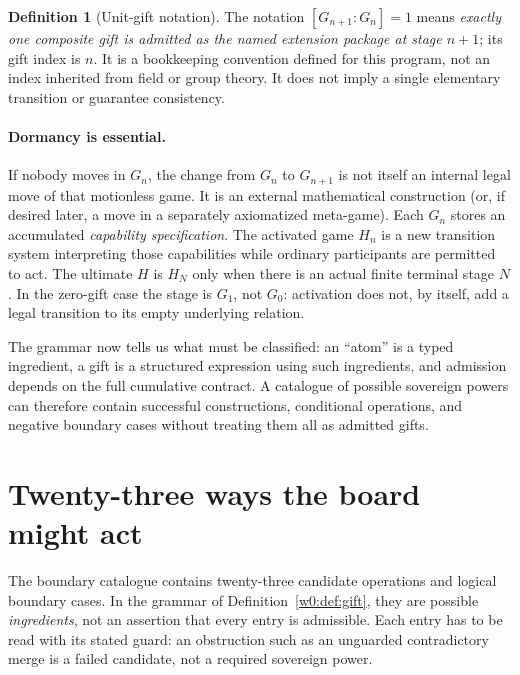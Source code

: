 \documentclass[11pt,letterpaper]{article}
\theoremstyle{definition}\newtheorem{definition}[theorem]{Definition}\newtheorem{example}[theorem]{Example}
\theoremstyle{remark}\newtheorem{remark}[theorem]{Remark}
\begin{document}
\begin{definition}[Unit-gift notation]\label{w0:def:unit}
The notation $[G_{n+1}:G_n]=1$ means \emph{exactly one composite gift is admitted as the named extension package at stage $n+1$}; its gift index is $n$. It is a bookkeeping convention defined for this program, not an index inherited from field or group theory. It does not imply a single elementary transition or guarantee consistency.
\end{definition}

\paragraph{Dormancy is essential.} If nobody moves in $G_n$, the change from $G_n$ to $G_{n+1}$ is not itself an internal legal move of that motionless game. It is an external mathematical construction (or, if desired later, a move in a separately axiomatized meta-game). Each $G_n$ stores an accumulated \emph{capability specification}. The activated game $H_n$ is a new transition system interpreting those capabilities while ordinary participants are permitted to act. The ultimate $H$ is $H_N$ only when there is an actual finite terminal stage $N$. In the zero-gift case the stage is $G_1$, not $G_0$: activation does not, by itself, add a legal transition to its empty underlying relation.

\noindent
The grammar now tells us what must be classified: an ``atom'' is a typed
ingredient, a gift is a structured expression using such ingredients, and
admission depends on the full cumulative contract. A catalogue of possible
sovereign powers can therefore contain successful constructions, conditional
operations, and negative boundary cases without treating them all as admitted
gifts.

\section{Twenty-three ways the board might act}\label{sec:atoms}
The boundary catalogue \cite{sovereign,checkpoint,map} contains twenty-three
candidate operations and logical boundary cases. In the grammar of
Definition~\ref{w0:def:gift}, they are possible \emph{ingredients}, not
an assertion that every entry is admissible. Each entry has to be read with
its stated guard: an obstruction such as an unguarded contradictory merge
is a failed candidate, not a required sovereign power.
\end{document}
